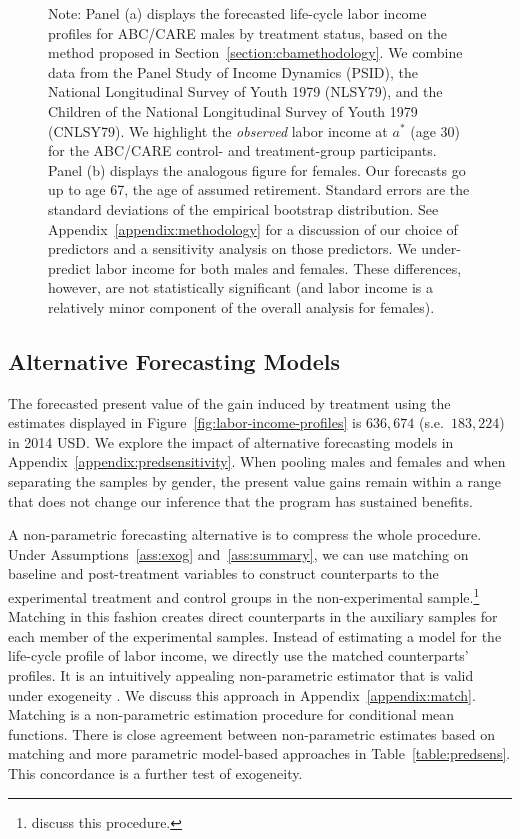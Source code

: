 \begin{figure}
Note: Panel (a) displays the forecasted life-cycle labor income profiles for ABC/CARE males by treatment status, based on the method proposed in Section~\ref{section:cbamethodology}. We combine data from the Panel Study of Income Dynamics (PSID), the National Longitudinal Survey of Youth 1979 (NLSY79), and the Children of the National Longitudinal Survey of Youth 1979 (CNLSY79). We highlight the \textit{observed} labor income at $a^*$ (age 30) for the ABC/CARE control- and treatment-group participants. Panel (b) displays the analogous figure for females. Our forecasts go up to age 67, the age of assumed retirement. Standard errors are the standard deviations of the empirical bootstrap distribution. See  Appendix~\ref{appendix:methodology} for a discussion of our choice of predictors and a sensitivity analysis on those predictors. We under-predict labor income for both males and females. These differences, however, are not statistically significant (and labor income is a relatively minor component of the overall analysis for females).
\end{figure}

\subsection{Alternative Forecasting Models} \label{section:sens}

The forecasted present value of the gain induced by treatment using the estimates displayed in Figure~\ref{fig:labor-income-profiles} is $636,674$ (s.e.\ $183,224$) in 2014 USD. We explore the impact of alternative forecasting models in Appendix~\ref{appendix:predsensitivity}. When pooling males and females and when separating the samples by gender, the present value gains remain within a range that does not change our inference that the program has sustained benefits.

A non-parametric forecasting alternative is to compress the whole procedure. Under Assumptions~\ref{ass:exog} and~\ref{ass:summary}, we can use matching on baseline and post-treatment variables to construct counterparts to the experimental treatment and control groups in the non-experimental sample.\footnote{\citet{Heckman_Ichimura_etal_1998_Econometrica} discuss this procedure.} Matching in this fashion creates direct counterparts in the auxiliary samples for each member of the experimental samples. Instead of estimating a model for the life-cycle profile of labor income, we directly use the matched counterparts' profiles. It is an intuitively appealing non-parametric estimator that is valid under exogeneity \citep{Heckman_Navarro_2004_REStat}. We discuss this approach in Appendix~\ref{appendix:match}. Matching is a non-parametric estimation procedure for conditional mean functions. There is close agreement between non-parametric estimates based on matching and more parametric model-based approaches in Table~\ref{table:predsens}. This concordance is a further test of exogeneity. 


